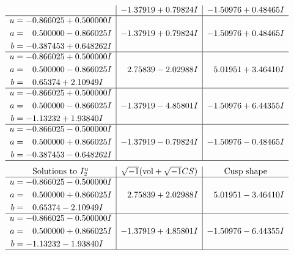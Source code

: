 \documentclass[1p]{elsarticle_modified}
\theoremstyle{definition}
\newcommand{\I}{\sqrt{-1}}
\begin{document}
$$\begin{array}{c|c|c}
 & -1.37919 + 0.79824 I & -1.50976 + 0.48465 I \\ \hline\begin{aligned}
u &= -0.866025 + 0.500000 I \\
a &= \phantom{-}0.500000 - 0.866025 I \\
b &= -0.387453 + 0.648262 I\end{aligned}
 & -1.37919 + 0.79824 I & -1.50976 + 0.48465 I \\ \hline\begin{aligned}
u &= -0.866025 + 0.500000 I \\
a &= \phantom{-}0.500000 - 0.866025 I \\
b &= \phantom{-}0.65374 + 2.10949 I\end{aligned}
 & \phantom{-}2.75839 - 2.02988 I & \phantom{-}5.01951 + 3.46410 I \\ \hline\begin{aligned}
u &= -0.866025 + 0.500000 I \\
a &= \phantom{-}0.500000 - 0.866025 I \\
b &= -1.13232 + 1.93840 I\end{aligned}
 & -1.37919 - 4.85801 I & -1.50976 + 6.44355 I \\ \hline\begin{aligned}
u &= -0.866025 - 0.500000 I \\
a &= \phantom{-}0.500000 + 0.866025 I \\
b &= -0.387453 - 0.648262 I\end{aligned}
 & -1.37919 - 0.79824 I & -1.50976 - 0.48465 I\\
 \hline 
 \end{array}$$\newpage$$\begin{array}{c|c|c}  
\text{Solutions to }I^u_{2}& \I (\text{vol} + \sqrt{-1}CS) & \text{Cusp shape}\\
 \hline 
\begin{aligned}
u &= -0.866025 - 0.500000 I \\
a &= \phantom{-}0.500000 + 0.866025 I \\
b &= \phantom{-}0.65374 - 2.10949 I\end{aligned}
 & \phantom{-}2.75839 + 2.02988 I & \phantom{-}5.01951 - 3.46410 I \\ \hline\begin{aligned}
u &= -0.866025 - 0.500000 I \\
a &= \phantom{-}0.500000 + 0.866025 I \\
b &= -1.13232 - 1.93840 I\end{aligned}
 & -1.37919 + 4.85801 I & -1.50976 - 6.44355 I\\
 \hline 
 \end{array}$$\newpage
\end{document}
